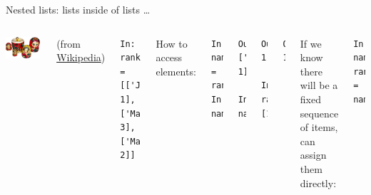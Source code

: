 \documentclass[aspectratio=169,usenames,dvipsnames]{beamer}
\begin{document}
\begin{frame}[fragile]{Nested lists: lists inside of lists \dots}
    \begin{columns}
            \includegraphics[width=0.95\textwidth]{fig/russiandolls}

            {\scriptsize
            (from \href{https://en.wikipedia.org/wiki/Matryoshka_doll#/media/File:Matryoshka_transparent.png}{Wikipedia})}
\begin{lstlisting}
In: ranking = [['John', 1], ['Mary', 3], ['Max', 2]]
\end{lstlisting}

\pause
How to access elements:
\begin{lstlisting}
In: name_and_rank = ranking[0]
In: name_and_rank
\end{lstlisting}\vspace{-1em}\pause\begin{lstlisting}
Out: ['John', 1]

In: name_and_rank[1]
\end{lstlisting}\vspace{-1em}\pause\begin{lstlisting}
Out: 1

In: ranking[0][1]
\end{lstlisting}\vspace{-1em}\pause\begin{lstlisting}
Out: 1
\end{lstlisting}
\pause
If we know there will be a fixed sequence of items,
can assign them directly:
\begin{lstlisting}
In: name, rank = name_and_rank
\end{lstlisting}
    \end{columns}
\end{frame}
\end{document}
